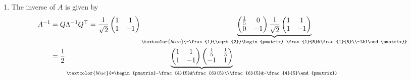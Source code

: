{\begin{enumerate}
\begin{enumerate}
\begin{align*}
	Q\Lambda Q^T &=\frac{1}{\sqrt{2}}\begin{pmatrix} 1&1\\1&-1\end{pmatrix}\underbrace{\begin{pmatrix}5&0\\0&-1\end{pmatrix}\frac{1}{\sqrt{2}}\begin{pmatrix}1&1\\1&-1\end{pmatrix}}_{\textcolor{blue}{=\frac{1}{\sqrt{2}}\begin{pmatrix}5&5\\-1&1\end{pmatrix}}}\\
	&=\frac{1}{2}\underbrace{\begin{pmatrix}1&1\\1&-1\end{pmatrix}\begin{pmatrix}5&5\\-1&1\end{pmatrix}}_{\textcolor{blue}{=\begin{pmatrix}4&6\\6&4\end{pmatrix}}}\\
	&=A~~(\checkmark)
	\end{align*}
\end{enumerate}
\item The inverse of $A$ is given by
\begin{align*}
 A^{-1} &= Q \Lambda^{-1}Q^\top =\frac{1}{\sqrt{2}}\begin{pmatrix} 1&1\\1&-1\end{pmatrix}\underbrace{\begin{pmatrix}\frac{1}{5}&0\\0&-1\end{pmatrix}\frac{1}{\sqrt{2}}\begin{pmatrix}1&1\\1&-1\end{pmatrix}}_{\textcolor{blue}{=\frac{1}{\sqrt{2}}\begin{pmatrix} \frac{1}{5}&\frac{1}{5}\\-1&1\end{pmatrix}}}\\
 	&=\frac{1}{2}\underbrace{\begin{pmatrix}1&1\\1&-1\end{pmatrix}\begin{pmatrix} \frac{1}{5}&\frac{1}{5}\\-1&1\end{pmatrix}}_{\textcolor{blue}{=\begin{pmatrix}-\frac{4}{5}&\frac{6}{5}\\\frac{6}{5}&-\frac{4}{5}\end{pmatrix}}}\\

\end{align*}
\end{enumerate}}
